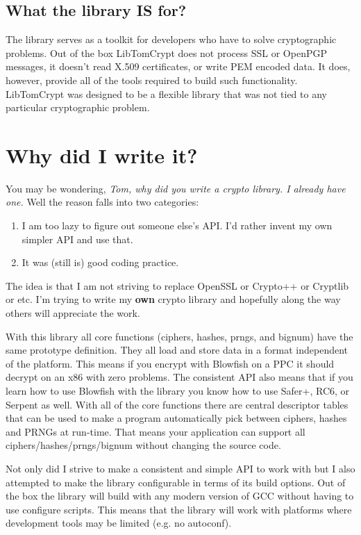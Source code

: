 \documentclass[synpaper]{book}
\newcommand{\mysection}[1]    %
	{                   %
	\section{#1}
   \markboth{\textsf{www.libtom.org}}{\thesection ~ {#1}}
	}
\begin{document}
\subsection{What the library IS for?}

The library serves as a toolkit for developers who have to solve cryptographic problems.  Out of the box LibTomCrypt
does not process SSL or OpenPGP messages, it doesn't read X.509 certificates, or write PEM encoded data.  It does, however,
provide all of the tools required to build such functionality.  LibTomCrypt was designed to be a flexible library that
was not tied to any particular cryptographic problem.

\mysection{Why did I write it?}
You may be wondering, \textit{Tom, why did you write a crypto library.  I already have one.}  Well the reason falls into
two categories:
\begin{enumerate}
    \item I am too lazy to figure out someone else's API.  I'd rather invent my own simpler API and use that.
    \item It was (still is) good coding practice.
\end{enumerate}

The idea is that I am not striving to replace OpenSSL or Crypto++ or Cryptlib or etc.  I'm trying to write my
{\bf own} crypto library and hopefully along the way others will appreciate the work.

With this library all core functions (ciphers, hashes, prngs, and bignum) have the same prototype definition.  They all load
and store data in a format independent of the platform.  This means if you encrypt with Blowfish on a PPC it should decrypt
on an x86 with zero problems.  The consistent API also means that if you learn how to use Blowfish with the library you
know how to use Safer+, RC6, or Serpent as well.  With all of the core functions there are central descriptor tables
that can be used to make a program automatically pick between ciphers, hashes and PRNGs at run-time.  That means your
application can support all ciphers/hashes/prngs/bignum without changing the source code.

Not only did I strive to make a consistent and simple API to work with but I also attempted to make the library
configurable in terms of its build options.  Out of the box the library will build with any modern version of GCC
without having to use configure scripts.  This means that the library will work with platforms where development
tools may be limited (e.g. no autoconf).
\end{document}
